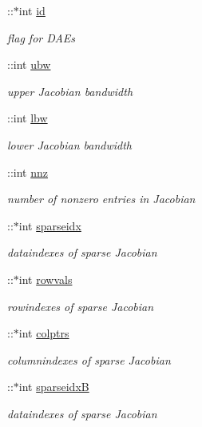 \begin{DoxyCompactItemize}
\+::$\ast$int \hyperlink{classamimodel_acf2488b95c97e0378c9bf49de3b50f28}{id}
\begin{DoxyCompactList}\small\item\em flag for D\+A\+Es \end{DoxyCompactList}\item 
\+::int \hyperlink{classamimodel_a955c9d10635afed4ebc04c60010e5d40}{ubw}
\begin{DoxyCompactList}\small\item\em upper Jacobian bandwidth \end{DoxyCompactList}\item 
\+::int \hyperlink{classamimodel_a784f5fb2b8eda576179be087c2a09a39}{lbw}
\begin{DoxyCompactList}\small\item\em lower Jacobian bandwidth \end{DoxyCompactList}\item 
\+::int \hyperlink{classamimodel_a825ec588729c090ff51ea3473dcbc6b9}{nnz}
\begin{DoxyCompactList}\small\item\em number of nonzero entries in Jacobian \end{DoxyCompactList}\item 
\+::$\ast$int \hyperlink{classamimodel_a6ffb112eda9ff756e17104210981b30b}{sparseidx}
\begin{DoxyCompactList}\small\item\em dataindexes of sparse Jacobian \end{DoxyCompactList}\item 
\+::$\ast$int \hyperlink{classamimodel_aa0abea3560da3f409a28567f42d52872}{rowvals}
\begin{DoxyCompactList}\small\item\em rowindexes of sparse Jacobian \end{DoxyCompactList}\item 
\+::$\ast$int \hyperlink{classamimodel_a887e8a11654afa197d040d8bb10cbb38}{colptrs}
\begin{DoxyCompactList}\small\item\em columnindexes of sparse Jacobian \end{DoxyCompactList}\item 
\+::$\ast$int \hyperlink{classamimodel_adcfae93a688a66f1954d0832f51e4cc0}{sparseidx\+B}
\begin{DoxyCompactList}\small\item\em dataindexes of sparse Jacobian \end{DoxyCompactList}\item 

\end{DoxyCompactItemize}
